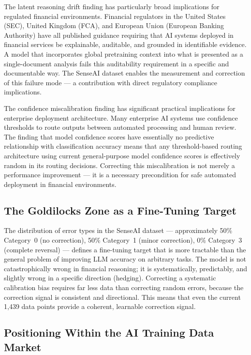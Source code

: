 \documentclass[11pt,a4paper]{article}
\begin{document}
The latent reasoning drift finding has particularly broad implications for regulated
financial environments. Financial regulators in the United States (SEC), United
Kingdom (FCA), and European Union (European Banking Authority) have all published
guidance requiring that AI systems deployed in financial services be explainable,
auditable, and grounded in identifiable evidence. A model that incorporates global
pretraining context into what is presented as a single-document analysis fails this
auditability requirement in a specific and documentable way. The SenseAI dataset
enables the measurement and correction of this failure mode --- a contribution with
direct regulatory compliance implications.

The confidence miscalibration finding has significant practical implications for
enterprise deployment architecture. Many enterprise AI systems use confidence
thresholds to route outputs between automated processing and human review. The
finding that model confidence scores have essentially no predictive relationship with
classification accuracy means that any threshold-based routing architecture using
current general-purpose model confidence scores is effectively random in its routing
decisions. Correcting this miscalibration is not merely a performance improvement
--- it is a necessary precondition for safe automated deployment in financial
environments.

\subsection{The Goldilocks Zone as a Fine-Tuning Target}

The distribution of error types in the SenseAI dataset --- approximately 50\%
Category~0 (no correction), 50\% Category~1 (minor correction), 0\% Category~3
(complete reversal) --- defines a fine-tuning target that is more tractable than the
general problem of improving LLM accuracy on arbitrary tasks. The model is not
catastrophically wrong in financial reasoning; it is systematically, predictably, and
slightly wrong in a specific direction (hedging). Correcting a systematic calibration
bias requires far less data than correcting random errors, because the correction
signal is consistent and directional. This means that even the current 1,439 data
points provide a coherent, learnable correction signal.

\subsection{Positioning Within the AI Training Data Market}
\end{document}
